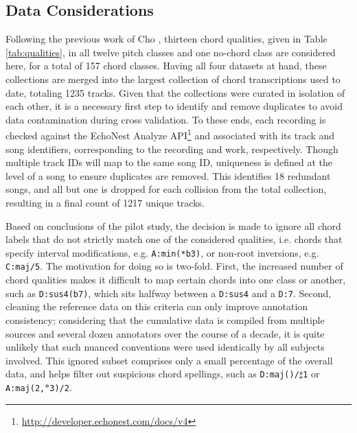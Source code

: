 \subsection{Data Considerations}
\label{subsec:data_considerations}
Following the previous work of Cho \cite{Cho2014Improved}, thirteen chord qualities, given in Table \ref{tab:qualities}, in all twelve pitch classes and one no-chord class are considered here, for a total of 157 chord classes.
Having all four datasets at hand, these collections are merged into the largest collection of chord transcriptions used to date, totaling 1235 tracks.
Given that the collections were curated in isolation of each other, it is a necessary first step to identify and remove duplicates to avoid data contamination during cross validation.
To these ends, each recording is checked against the EchoNest Analyze API\footnote{\url{http://developer.echonest.com/docs/v4}} and associated with its track and song identifiers, corresponding to the recording and work, respectively.
Though multiple track IDs will map to the same song ID, uniqueness is defined at the level of a song to ensure duplicates are removed.
This identifies 18 redundant songs, and all but one is dropped for each collision from the total collection, resulting in a final count of 1217 unique tracks.

Based on conclusions of the pilot study, the decision is made to ignore all chord labels that do not strictly match one of the considered qualities, i.e. chords that specify interval modifications, e.g. \texttt{A:min(*b3)}, or non-root inversions, e.g. \texttt{C:maj/5}.
The motivation for doing so is two-fold.
First, the increased number of chord qualities makes it difficult to map certain chords into one class or another, such as \texttt{D:sus4(b7)}, which sits halfway between a \texttt{D:sus4} and a \texttt{D:7}.
Second, cleaning the reference data on this criteria can only improve annotation consistency; considering that the cumulative data is compiled from multiple sources and several dozen annotators over the course of a decade, it is quite unlikely that such nuanced conventions were used identically by all subjects involved.
This ignored subset comprises only a small percentage of the overall data, and helps filter out suspicious chord spellings, such as \texttt{D:maj()/$\sharp$1} or \texttt{A:maj(2,$\ast$3)/2}.

